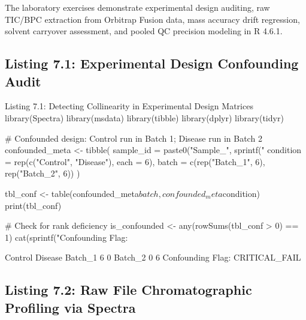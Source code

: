 \documentclass[11pt,twoside,openright]{book}
\begin{document}
The laboratory exercises demonstrate experimental design auditing, raw TIC/BPC extraction from Orbitrap Fusion data, mass accuracy drift regression, solvent carryover assessment, and pooled QC precision modeling in R 4.6.1.

\subsection{Listing 7.1: Experimental Design Confounding Audit}

\begin{rchunk}{Listing 7.1: Detecting Collinearity in Experimental Design Matrices}
library(Spectra)
library(msdata)
library(tibble)
library(dplyr)
library(tidyr)

# Confounded design: Control run in Batch 1; Disease run in Batch 2
confounded_meta <- tibble(
  sample_id = paste0("Sample_", sprintf("%
  condition = rep(c("Control", "Disease"), each = 6),
  batch     = c(rep("Batch_1", 6), rep("Batch_2", 6))
)

tbl_conf <- table(confounded_meta$batch, confounded_meta$condition)
print(tbl_conf)

# Check for rank deficiency
is_confounded <- any(rowSums(tbl_conf > 0) == 1)
cat(sprintf("Confounding Flag: %
\end{rchunk}

\begin{routput}
         Control Disease
Batch\_1       6       0
Batch\_2       0       6
Confounding Flag: CRITICAL\_FAIL
\end{routput}

\subsection{Listing 7.2: Raw File Chromatographic Profiling via Spectra}

\end{document}
